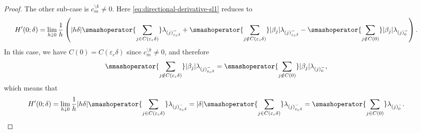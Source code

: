 \begin{proof}
    The other sub-case is \(c_m^{\setminus k} \neq 0\). Here
    \eqref{eq:directional-derivative-sl1} reduces to
    \begin{equation*}
      H'(0; \delta) = \lim_{h \downarrow 0}
      \frac{1}{h}
      \left(
        |h \delta| \smashoperator{\sum_{j \in C({\varepsilon_c}\delta)}} \lambda_{(j)^-_{{\varepsilon_c}\delta}}
        + \smashoperator{\sum_{j \notin C({\varepsilon_c}\delta)}} |\beta_j| \lambda_{(j)^-_{{\varepsilon_c}\delta}}
        - \smashoperator{\sum_{j \notin C(0)}} |\beta_j| \lambda_{(j)^-_{0}}
      \right).
    \end{equation*}
    In this case, we have \(C(0) = C({\varepsilon_c}\delta)\) since \(c_m^{\setminus k}
    \neq 0\), and therefore
    \[
      \smashoperator{\sum_{j \notin C({\varepsilon_c}\delta)}} |\beta_j| \lambda_{(j)^-_{{\varepsilon_c}\delta}}
      = \smashoperator{\sum_{j \notin C(0)}} |\beta_j| \lambda_{(j)^-_{0}},
    \]
    which means that
    \begin{equation*}
      H'(0; \delta) = \lim_{h \downarrow 0}
      \frac{1}{h}
      |h \delta| \smashoperator{\sum_{j \in C({\varepsilon_c}\delta)}} \lambda_{(j)^-_{{\varepsilon_c}\delta}}
      = |\delta|\smashoperator{\sum_{j \in C({\varepsilon_c}\delta)}} \lambda_{(j)^-_{{\varepsilon_c}\delta}}
      = \smashoperator{\sum_{j \in C(0)}} \lambda_{(j)^-_{0}}.
    \end{equation*}
  \end{proof}
